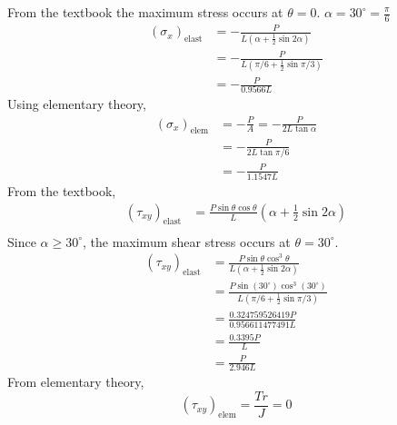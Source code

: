 From the textbook the maximum stress occurs at $\theta = 0$. $\alpha = 30^\circ = \frac{\pi}{6}$
\begin{align*}
    (\sigma_{x})_{\text{elast}} &= - \frac{P}{L(\alpha + \frac{1}{2}\sin{2\alpha})} \\
    &= -\frac{P}{L(\pi/6 + \frac{1}{2}\sin{\pi/3})} \\
    &= \boxed{-\frac{P}{0.9566L}}
\end{align*}
Using elementary theory,
\begin{align*}
    (\sigma_{x})_{\text{elem}} &= - \frac{P}{A} = - \frac{P}{2 L \tan{\alpha}} \\
    &= - \frac{P}{2 L \tan{\pi/6}} \\
    &= \boxed{-\frac{P}{1.1547L}}
\end{align*}
From the textbook,
\begin{align*}
    (\tau_{xy})_{\text{elast}} &= \frac{P\sin\theta \cos\theta}L(\alpha + \frac{1}{2}\sin{2\alpha}) \\
\end{align*}
Since $\alpha \geq 30^\circ$, the maximum shear stress occurs at $\theta = 30^\circ$.
\begin{align*}
    (\tau_{xy})_{\text{elast}} &= \frac{P\sin\theta \cos^3\theta}{L(\alpha + \frac{1}{2}\sin{2\alpha})} \\
    &= \frac{P\sin(30^\circ) \cos^3(30^\circ)}{L(\pi/6 + \frac{1}{2}\sin{\pi/3})} \\
    &= \frac{0.324759526419P}{0.956611477491L} \\
    &= \frac{0.3395P}{L}\\
    &= \boxed{\frac{P}{2.946L}}
\end{align*}
From elementary theory,
\begin{equation*}
    (\tau_{xy})_{\text{elem}} = \frac{Tr}{J} = \boxed{0}
\end{equation*}